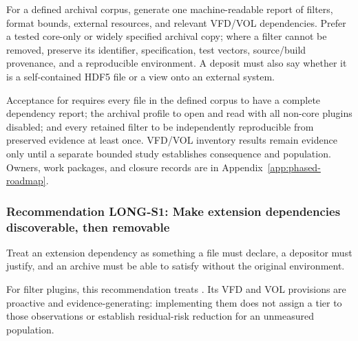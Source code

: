 \documentclass[../main.tex]{subfiles}
\begin{document}
For a defined archival corpus, generate one machine-readable report of filters,
format bounds, external resources, and relevant VFD/VOL dependencies. Prefer a
tested core-only or widely specified archival copy; where a filter cannot be
removed, preserve its identifier, specification, test vectors, source/build
provenance, and a reproducible environment. A deposit must also say whether it
is a self-contained HDF5 file or a view onto an external system.

Acceptance for  requires every file in the defined corpus to
have a complete dependency report; the archival profile to open and read with
all non-core plugins disabled; and every retained filter to be independently
reproducible from preserved evidence at least once. VFD/VOL inventory results
remain evidence only until a separate bounded study establishes consequence
and population. Owners, work packages, and closure records are in
Appendix~\ref{app:phased-roadmap}.

\iffalse
\subsubsection*{Recommendation LONG-S1: Make extension dependencies discoverable, then removable}

Treat an extension dependency as something a file must declare, a depositor
must justify, and an archive must be able to satisfy without the original
environment.

For filter plugins, this recommendation treats . Its VFD and
VOL provisions are proactive and evidence-generating: implementing them does not
assign a tier to those observations or establish residual-risk reduction for an
unmeasured population.
\end{document}
